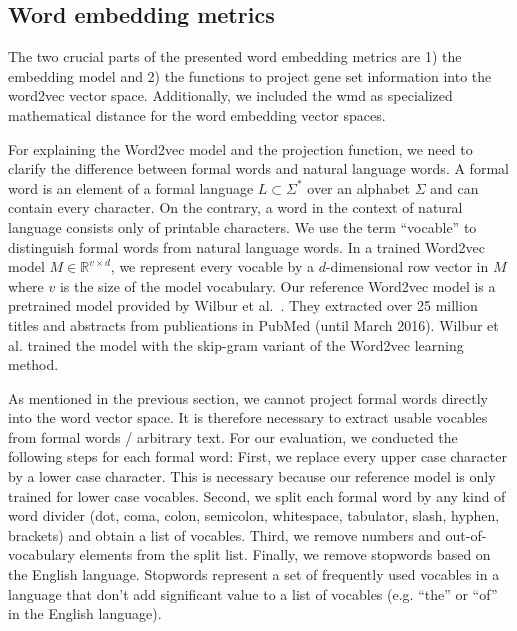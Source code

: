 \documentclass{thesisclass}
\begin{document}
\subsection{Word embedding metrics}

The two crucial parts of the presented word embedding metrics are 1) the embedding model and 2) the functions to project gene set information into the word2vec vector space.
Additionally, we included the \acrshort{wmd} as specialized mathematical distance for the word embedding vector spaces.

For explaining the Word2vec model and the projection function, we need to clarify the difference between formal words and natural language words. 
A formal word is an element of a formal language  $L \subset \Sigma^*$ over an alphabet $\Sigma$ and can contain every character. On the contrary, a word in the context of natural language consists only of printable characters. We use the term ``vocable'' to distinguish formal words from natural language words.
In a trained Word2vec model $M \in \mathbb{R}^{v \times d}$, we represent every vocable by a $d$-dimensional row vector in $M$ where $v$ is the size of the model vocabulary.
Our reference Word2vec model is a pretrained model provided by Wilbur et al.~\cite{KIM2017122}. 
They extracted over 25 million titles and abstracts from publications in PubMed (until March 2016). 
Wilbur et al. trained the model with the skip-gram variant of the Word2vec learning method.

As mentioned in the previous section, we cannot project formal words directly into the word vector space.
It is therefore necessary to extract usable vocables from formal words / arbitrary text. 
For our evaluation, we conducted the following steps for each formal word:
First, we replace every upper case character by a lower case character. This is necessary because our reference model is only trained for lower case vocables.
Second, we split each formal word by any kind of word divider (dot, coma, colon, semicolon, whitespace, tabulator, slash, hyphen, brackets) and obtain a list of vocables.
Third, we remove numbers and out-of-vocabulary elements from the split list.
Finally, we remove stopwords based on the English language. Stopwords represent a set of frequently used vocables in a language that don't add significant value to a list of vocables (e.g. ``the'' or ``of'' in the English language).
\end{document}
